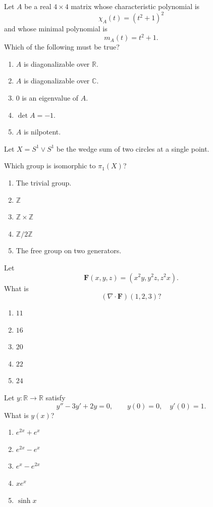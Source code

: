 \begin{exercise}
Let $A$ be a real $4\times4$ matrix
whose characteristic polynomial is
\[
\chi_A(t)=(t^2+1)^2
\]
and whose minimal polynomial is
\[
m_A(t)=t^2+1.
\]
Which of the following must be true?
\begin{enumerate}[label=(\Alph*)]
\item $A$ is diagonalizable over $\mathbb R$.
\item $A$ is diagonalizable over $\mathbb C$.
\item $0$ is an eigenvalue of $A$.
\item $\det A=-1$.
\item $A$ is nilpotent.
\end{enumerate}
\end{exercise}

\begin{exercise}
Let $X=S^1\vee S^1$ be the wedge sum of
two circles at a single point.

Which group is isomorphic to $\pi_1(X)$?
\begin{enumerate}[label=(\Alph*)]
\item The trivial group.
\item $\mathbb Z$
\item $\mathbb Z\times\mathbb Z$
\item $\mathbb Z/2\mathbb Z$
\item The free group on two generators.
\end{enumerate}
\end{exercise}

\begin{exercise}
Let
\[
\mathbf F(x,y,z)
=
(x^2y,y^2z,z^2x).
\]
What is
\[
(\nabla\cdot\mathbf F)(1,2,3)?
\]
\begin{enumerate}[label=(\Alph*)]
\item $11$
\item $16$
\item $20$
\item $22$
\item $24$
\end{enumerate}
\end{exercise}

\begin{exercise}
Let $y:\mathbb R\to\mathbb R$ satisfy
\[
y''-3y'+2y=0,
\qquad
y(0)=0,\quad y'(0)=1.
\]
What is $y(x)$?
\begin{enumerate}[label=(\Alph*)]
\item $e^{2x}+e^x$
\item $e^{2x}-e^x$
\item $e^x-e^{2x}$
\item $xe^x$
\item $\sinh x$
\end{enumerate}
\end{exercise}

